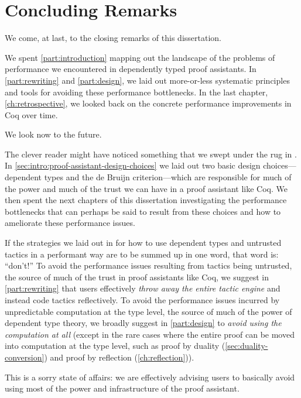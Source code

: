 \chapter{Concluding Remarks}\label{ch:conclusion}
We come, at last, to the closing remarks of this dissertation.

We spent \autoref{part:introduction} mapping out the landscape of the problems of performance we encountered in dependently typed proof assistants.
In \autoref{part:rewriting} and \autoref{part:design}, we laid out more-or-less systematic principles and tools for avoiding these performance bottlenecks.
In the last chapter, \autoref{ch:retrospective}, we looked back on the concrete performance improvements in Coq over time.

We look now to the future.

The clever reader might have noticed something that we swept under the rug in .
In \autoref{sec:intro:proof-assistant-design-choices} we laid out two basic design choices---dependent types and the de Bruijn criterion---which are responsible for much of the power and much of the trust we can have in a proof assistant like Coq.
We then spent the next chapters of this dissertation investigating the performance bottlenecks that can perhaps be said to result from these choices and how to ameliorate these performance issues.

If the strategies we laid out in  for how to use dependent types and untrusted tactics in a performant way are to be summed up in one word, that word is: ``don't!''
To avoid the performance issues resulting from tactics being untrusted, the source of much of the trust in proof assistants like Coq, we suggest in \autoref{part:rewriting} that users effectively \emph{throw away the entire tactic engine} and instead code tactics reflectively.
To avoid the performance issues incurred by unpredictable computation at the type level, the source of much of the power of dependent type theory, we broadly suggest in \autoref{part:design} to \emph{avoid using the computation at all} (except in the rare cases where the entire proof can be moved into computation at the type level, such as proof by duality (\autoref{sec:duality-conversion}) and proof by reflection (\autoref{ch:reflection})).

This is a sorry state of affairs:
we are effectively advising users to basically avoid using most of the power and infrastructure of the proof assistant.

